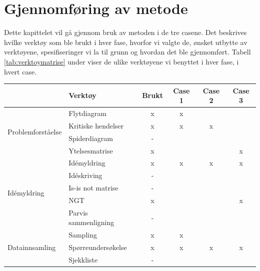\chapter{Gjennomføring av metode}
Dette kapittelet vil gå gjennom bruk av metoden i de tre casene. Det beskrives hvilke verktøy som ble brukt i hver fase, hvorfor vi valgte de, ønsket utbytte av verktøyene, spesifiseringer vi la til grunn og hvordan det ble gjennomført. Tabell \ref{tab:verktoymatrise} under viser de ulike verktøyene vi benyttet i hver fase, i hvert case. 
\begin{table}[htbp]
  \centering
    \begin{tabular}{|l|l|c|r|r|r|}
    \hline
         \cellcolor{yellow} & \cellcolor{yellow} Verktøy & \cellcolor{yellow} Brukt & \multicolumn{1}{c|}{\cellcolor{yellow} Case 1} & \multicolumn{1}{c|}{\cellcolor{yellow} Case 2} & \multicolumn{1}{c|}{\cellcolor{yellow} Case 3} \\
    \hline
    \multicolumn{1}{|l|}{\multirow{4}[8]{*}{Problemforståelse}} & Flytdiagram & x     & \multicolumn{1}{c|}{x} &       &  \\
\cline{2-6}          & Kritiske hendelser & x     & \multicolumn{1}{c|}{x} & \multicolumn{1}{c|}{x} &  \\
\cline{2-6}          & Spiderdiagram & -     &       &       &  \\
\cline{2-6}          & Ytelsesmatrise & x     &       &       & \multicolumn{1}{c|}{x} \\
    \hline
    \multicolumn{1}{|l|}{\multirow{5}[10]{*}{Idémyldring}} & Idémyldring & x     & \multicolumn{1}{c|}{x} & \multicolumn{1}{c|}{x} & \multicolumn{1}{c|}{x} \\
\cline{2-6}          & Idéskriving & -     &       &       &  \\
\cline{2-6}          & Is-is not matrise & -     &       &       &  \\
\cline{2-6}          & NGT   & x     &       &       & \multicolumn{1}{c|}{x} \\
\cline{2-6}          & Parvis sammenligning & -     &       &       &  \\
    \hline
    \multicolumn{1}{|l|}{\multirow{3}[6]{*}{Datainnsamling}} & Sampling & x     &  \multicolumn{1}{c|}{x}  &       &  \\
\cline{2-6}          & Spørreundersøkelse & x     & \multicolumn{1}{c|}{x} & \multicolumn{1}{c|}{x} & \multicolumn{1}{c|}{x} \\
\cline{2-6}          & Sjekkliste & -     &       &       &  \\

\end{tabular}
\end{table}
